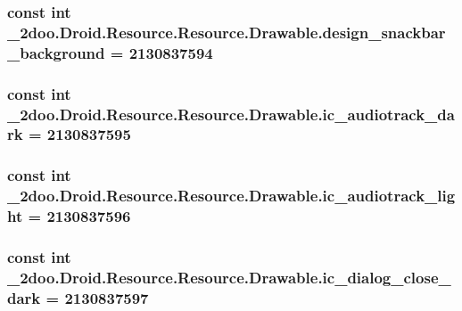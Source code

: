 \hypertarget{class__2doo_1_1_droid_1_1_resource_1_1_drawable_0036229cc52333991f8a75adc96ad54e}{
\subsubsection[{design\_\-snackbar\_\-background}]{\setlength{\rightskip}{0pt plus 5cm}const int \_\-2doo.Droid.Resource.Resource.Drawable.design\_\-snackbar\_\-background = 2130837594}}
\label{class__2doo_1_1_droid_1_1_resource_1_1_drawable_0036229cc52333991f8a75adc96ad54e}


\hypertarget{class__2doo_1_1_droid_1_1_resource_1_1_drawable_41719331fcb83ae2772541f9232470ae}{
\subsubsection[{ic\_\-audiotrack\_\-dark}]{\setlength{\rightskip}{0pt plus 5cm}const int \_\-2doo.Droid.Resource.Resource.Drawable.ic\_\-audiotrack\_\-dark = 2130837595}}
\label{class__2doo_1_1_droid_1_1_resource_1_1_drawable_41719331fcb83ae2772541f9232470ae}


\hypertarget{class__2doo_1_1_droid_1_1_resource_1_1_drawable_8af914bd0e138ac68798d3414c059753}{
\subsubsection[{ic\_\-audiotrack\_\-light}]{\setlength{\rightskip}{0pt plus 5cm}const int \_\-2doo.Droid.Resource.Resource.Drawable.ic\_\-audiotrack\_\-light = 2130837596}}
\label{class__2doo_1_1_droid_1_1_resource_1_1_drawable_8af914bd0e138ac68798d3414c059753}


\hypertarget{class__2doo_1_1_droid_1_1_resource_1_1_drawable_06626d98a66445d587572e2a27a035ef}{
\subsubsection[{ic\_\-dialog\_\-close\_\-dark}]{\setlength{\rightskip}{0pt plus 5cm}const int \_\-2doo.Droid.Resource.Resource.Drawable.ic\_\-dialog\_\-close\_\-dark = 2130837597}}
\label{class__2doo_1_1_droid_1_1_resource_1_1_drawable_06626d98a66445d587572e2a27a035ef}


